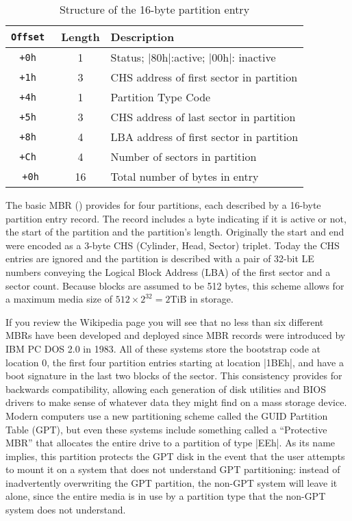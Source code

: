 \begin{table}
\caption{Structure of the 16-byte partition
  entry\label{mbr:partition}}
\begin{tabular}{|>{\tt}c|c|l|}
Offset & Length & Description \\
\hline
+0h & 1 & Status; |80h|:active; |00h|: inactive \\
+1h & 3 & CHS address of first sector in partition \\
+4h & 1 & Partition Type Code \\
+5h & 3 & CHS address of last sector in partition\\
+8h & 4 & LBA address of first sector in partition \\
+Ch & 4 & Number of sectors in partition \\
\hline
+0h & 16 & Total number of bytes in entry \\
\hline
\hline
\end{tabular}
\end{table}


The basic MBR () provides for four partitions, each
described by a 16-byte partition entry record. The record includes a byte
indicating if it is active or not, the start of the partition and the
partition's length.  Originally the start and end were encoded as a 
3-byte CHS (Cylinder, Head, Sector) triplet. Today the CHS entries are
ignored and the partition is described with a pair of 32-bit LE
numbers conveying the Logical Block Address (LBA) of the first sector
and a sector count. Because blocks
are assumed to be 512 bytes, this scheme allows for a
maximum media size of $512 \times 2^{32}=2\textrm{TiB}$ in storage.

If you review the Wikipedia page you will see that no less than six
different MBRs have been developed and deployed since
MBR records were introduced by IBM PC DOS 2.0 in 1983. All of these
systems store the bootstrap code at location 0, the first four
partition entries starting at location |1BEh|, and have a boot
signature in the last two blocks of the sector. This consistency 
provides for backwards compatibility, allowing each 
generation of disk utilities and BIOS drivers to make sense of
whatever data they might find on a mass storage device.  Modern
computers use a new partitioning scheme called the GUID Partition
Table (GPT), but even these systems include something called
a ``Protective MBR'' that allocates the entire drive to a partition of
type |EEh|. As its name implies, this partition protects the GPT disk in the
event that the user attempts to mount it on a system that does not
understand GPT partitioning: instead of inadvertently overwriting the
GPT partition, the non-GPT system will leave it alone, since the
entire media is in use by a partition type that the non-GPT system does not understand.


